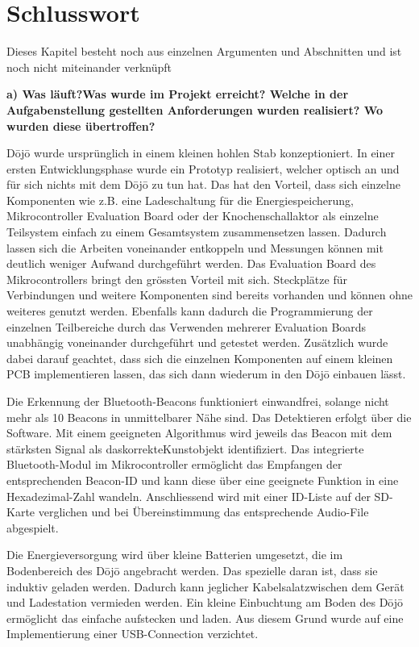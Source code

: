 \section{Schlusswort} \label{sec:schlusswort}

Dieses Kapitel besteht noch aus einzelnen Argumenten und Abschnitten und ist noch nicht miteinander verknüpft

\textbf{a) Was läuft?Was wurde im Projekt erreicht? Welche in der Aufgabenstellung gestellten Anforderungen wurden realisiert? Wo wurden diese übertroffen?}

Dōjō wurde ursprünglich in einem kleinen hohlen Stab konzeptioniert. In einer ersten Entwicklungsphase wurde ein Prototyp realisiert, welcher optisch an und für sich nichts mit dem Dōjō zu tun hat. Das hat den Vorteil, dass sich einzelne Komponenten wie z.B. eine Ladeschaltung für die Energiespeicherung, Mikrocontroller Evaluation Board oder der Knochenschallaktor als einzelne Teilsystem einfach zu einem Gesamtsystem zusammensetzen lassen. Dadurch lassen sich die Arbeiten voneinander entkoppeln und Messungen können mit deutlich weniger Aufwand durchgeführt werden. Das Evaluation Board des Mikrocontrollers bringt den grössten Vorteil mit sich. Steckplätze für Verbindungen und weitere Komponenten sind bereits vorhanden und können ohne weiteres genutzt werden. Ebenfalls kann dadurch die Programmierung der einzelnen Teilbereiche durch das Verwenden mehrerer Evaluation Boards unabhängig voneinander durchgeführt und getestet werden. Zusätzlich wurde dabei darauf geachtet, dass sich die einzelnen Komponenten auf einem kleinen PCB implementieren lassen, das sich dann wiederum in den Dōjō einbauen lässt.

Die Erkennung der Bluetooth-Beacons funktioniert einwandfrei, solange nicht mehr als 10 Beacons in unmittelbarer Nähe sind. Das Detektieren erfolgt über die Software. Mit einem geeigneten Algorithmus wird jeweils das Beacon mit dem stärksten Signal als das\glqq korrekte\grqq Kunstobjekt identifiziert. Das integrierte Bluetooth-Modul im Mikrocontroller ermöglicht das Empfangen der entsprechenden Beacon-ID und kann diese über eine geeignete Funktion in eine Hexadezimal-Zahl wandeln. Anschliessend wird mit einer ID-Liste auf der SD-Karte verglichen und bei Übereinstimmung das entsprechende Audio-File abgespielt.

Die Energieversorgung wird über kleine Batterien umgesetzt, die im Bodenbereich des Dōjō angebracht werden. Das spezielle daran ist, dass sie induktiv geladen werden. Dadurch kann jeglicher \glqq Kabelsalat\grqq zwischen dem Gerät und Ladestation vermieden werden. Ein kleine Einbuchtung am Boden des Dōjō ermöglicht das einfache aufstecken und laden. Aus diesem Grund wurde auf eine Implementierung einer USB-Connection verzichtet.

